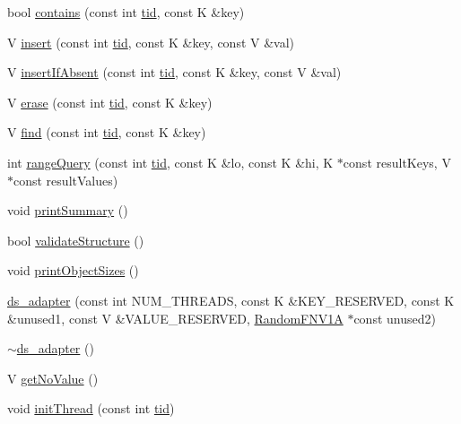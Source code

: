 \begin{DoxyCompactItemize}
\item 
bool \hyperlink{classds__adapter_aecf1899dbe9fae93c72ee2b5549cf6eb}{contains} (const int \hyperlink{microbench_2main_8cpp_a9ca9869868fe7e7a38a921cc7de4103f}{tid}, const K \&key)
\item 
V \hyperlink{classds__adapter_a6c0fc676d77e30e14946baf325174739}{insert} (const int \hyperlink{microbench_2main_8cpp_a9ca9869868fe7e7a38a921cc7de4103f}{tid}, const K \&key, const V \&val)
\item 
V \hyperlink{classds__adapter_ae9cb29ad0c0338c0e1d12ef97e008135}{insert\+If\+Absent} (const int \hyperlink{microbench_2main_8cpp_a9ca9869868fe7e7a38a921cc7de4103f}{tid}, const K \&key, const V \&val)
\item 
V \hyperlink{classds__adapter_a1bf459e8449df93cc738a644aeffdcfb}{erase} (const int \hyperlink{microbench_2main_8cpp_a9ca9869868fe7e7a38a921cc7de4103f}{tid}, const K \&key)
\item 
V \hyperlink{classds__adapter_a0109b0d011810f687c9e9273eb1d1bc8}{find} (const int \hyperlink{microbench_2main_8cpp_a9ca9869868fe7e7a38a921cc7de4103f}{tid}, const K \&key)
\item 
int \hyperlink{classds__adapter_a23a9c8db5425e98a93d647df1c6c23dd}{range\+Query} (const int \hyperlink{microbench_2main_8cpp_a9ca9869868fe7e7a38a921cc7de4103f}{tid}, const K \&lo, const K \&hi, K $\ast$const result\+Keys, V $\ast$const result\+Values)
\item 
void \hyperlink{classds__adapter_aac97293215557665d2ef1e1a0d06fcfd}{print\+Summary} ()
\item 
bool \hyperlink{classds__adapter_ae50fe8a8683c0278cdd4c45e1405860d}{validate\+Structure} ()
\item 
void \hyperlink{classds__adapter_a33b13b7059a8c0345fb59a324dc3a691}{print\+Object\+Sizes} ()
\item 
\hyperlink{classds__adapter_a8bd2274b39a6716d649cde5a8f313b40}{ds\+\_\+adapter} (const int N\+U\+M\+\_\+\+T\+H\+R\+E\+A\+DS, const K \&K\+E\+Y\+\_\+\+R\+E\+S\+E\+R\+V\+ED, const K \&unused1, const V \&V\+A\+L\+U\+E\+\_\+\+R\+E\+S\+E\+R\+V\+ED, \hyperlink{classRandomFNV1A}{Random\+F\+N\+V1A} $\ast$const unused2)
\item 
\hyperlink{classds__adapter_a366f46dd39d59f2d4a147589f5fd98e3}{$\sim$ds\+\_\+adapter} ()
\item 
V \hyperlink{classds__adapter_a9e1e4aec136b351d1a6820d70484a6c5}{get\+No\+Value} ()
\item 
void \hyperlink{classds__adapter_a3733f6a6b57312b1b5e4fb5181d82a0b}{init\+Thread} (const int \hyperlink{microbench_2main_8cpp_a9ca9869868fe7e7a38a921cc7de4103f}{tid})

\end{DoxyCompactItemize}

